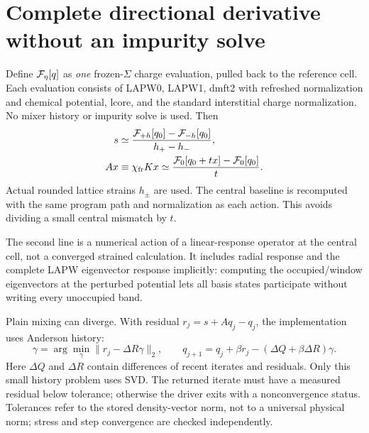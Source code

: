 \documentclass[11pt]{article}
\begin{document}
\section{Complete directional derivative without an impurity solve}
Define ${\cal F}_\eta[q]$ as \emph{one} frozen-$\Sigma$ charge evaluation,
pulled back to the reference cell. Each evaluation consists of LAPW0,
LAPW1, dmft2 with refreshed normalization and chemical potential, lcore,
and the standard interstitial charge normalization. No mixer history or
impurity solve is used. Then
\begin{align}
 s&\simeq\frac{{\cal F}_{+h}[q_0]-{\cal F}_{-h}[q_0]}{h_+-h_-},\\
 A x&\equiv\chi_{\rm fr}Kx
 \simeq\frac{{\cal F}_0[q_0+t x]-{\cal F}_0[q_0]}{t}.
 \label{eq:jvp}
\end{align}
Actual rounded lattice strains $h_\pm$ are used. The central baseline is
recomputed with the same program path and normalization as each action.
This avoids dividing a small central mismatch by $t$.

The second line is a numerical action of a linear-response operator at the
central cell, not a converged strained calculation. It includes radial
response and the complete LAPW eigenvector response implicitly: computing
the occupied/window eigenvectors at the perturbed potential lets all basis
states participate without writing every unoccupied band.

Plain mixing can diverge. With residual $r_j=s+Aq_j-q_j$, the implementation
uses Anderson history:
\begin{equation}
 \gamma=\arg\min_\gamma\|r_j-\Delta R\gamma\|_2,\qquad
 q_{j+1}=q_j+\beta r_j-(\Delta Q+\beta\Delta R)\gamma.
\end{equation}
Here $\Delta Q$ and $\Delta R$ contain differences of recent iterates and
residuals. Only this small history problem uses SVD. The returned iterate
must have a measured residual below tolerance; otherwise the driver exits
with a nonconvergence status. Tolerances refer to the stored density-vector
norm, not to a universal physical norm; stress and step convergence are
checked independently.
\end{document}
